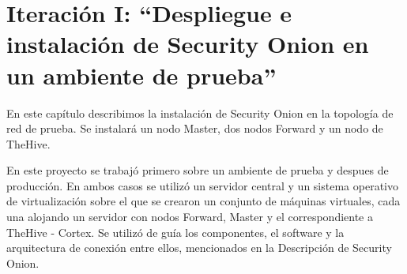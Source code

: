\chapter{\Large Iteración I: “Despliegue e instalación de Security Onion en un ambiente de prueba”}
    En este capítulo describimos la instalación de Security Onion en la topología de red de prueba. Se instalará un nodo Master, dos nodos Forward y un nodo de TheHive. \par
    En este proyecto se trabajó primero sobre un ambiente de prueba y despues de producción. En ambos casos se utilizó un servidor central y un sistema operativo de virtualización sobre el que se crearon un conjunto de máquinas virtuales, cada una alojando un servidor con nodos Forward, Master y el correspondiente a TheHive - Cortex. Se utilizó de guía los componentes, el software y la arquitectura de conexión entre ellos, mencionados en la Descripción de Security Onion. \par
